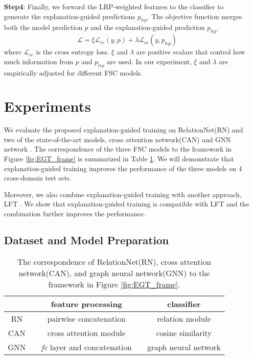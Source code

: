 \documentclass[a4paper,conference]{IEEEtran}
\begin{document}
\textbf{Step4}: Finally, we forward the LRP-weighted features to the classifier to generate the explanation-guided predictions $p_{lrp}$. The objective function merges both the model prediction $p$ and the explanation-guided prediction $p_{lrp}$.
    \begin{equation}
        \mathcal{L} = \xi \mathcal{L}_{ce}(y, p)+\lambda \mathcal{L}_{ce}(y, p_{lrp}) \label{equ:loss}
    \end{equation}
where $\mathcal{L}_{ce}$ is the cross entropy loss. $\xi$ and $\lambda$ are positive scalars that control how much information from $p$ and $p_{lrp}$ are used. In our experiment, $\xi$ and $\lambda$ are empirically adjusted for different FSC models. 
\section{Experiments}
\label{sec:experiment}
We evaluate the proposed explanation-guided training on RelationNet(RN)\cite{RN:sung2018learning} and two of the state-of-the-art models, cross attention network(CAN) \cite{CAN:hou2019cross} and GNN network \cite{FEWGNN:garcia2018fewshot}. The correspondence of the three FSC models to the framework in Figure \ref{fig:EGT_frame} is summarized in Table \ref{tab:RN_CAN_GNNmodules}. We will demonstrate that explanation-guided training improves the performance of the three models on 4 cross-domain test sets. 

Moreover, we also combine explanation-guided training with another approach, LFT \cite{FeaturewiseTranslayer:tseng2020cross}. We show that explanation-guided training is compatible with LFT and the combination further improves the performance. 

\subsection{Dataset and Model Preparation}
\begin{table}[tb]
    \centering
    \caption{The correspondence of RelationNet(RN), cross attention network(CAN), and graph neural network(GNN) to the framework in Figure \ref{fig:EGT_frame}.}
    \begin{tabular}{c c c c c}
    \hline
            & &  feature processing    & & classifier\\ \hline
        RN  & &  pairwise concatenation& & relation module\\
        CAN & &  cross attention module      & & cosine similarity \\ 
        GNN & &  \textit{fc} layer and concatenation& & graph neural network\\
        \hline
    \end{tabular}
    \label{tab:RN_CAN_GNNmodules}
\end{table}
\end{document}
